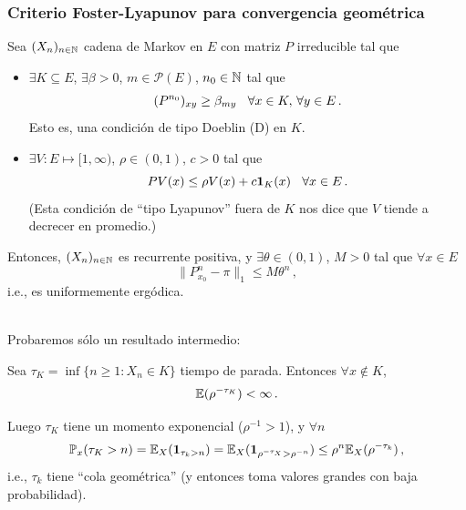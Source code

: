 \subsubsection{Criterio Foster-Lyapunov para convergencia geométrica}
\begin{theorem}[de Harris]
Sea $(X_n)_{n\in\mathbb{N}}$ cadena de Markov en $E$ con matriz $P$ irreducible tal que
\begin{itemize}
    \item $\exists K\subseteq E$, $\exists\beta>0$, $m\in\mathcal{P}(E)$, $n_0\in\mathbb{N}$ tal que
    $$ (P^{n_0})_{xy}\geq\beta_{my}\hspace{.25cm}\,\forall x\in K,\,\forall y\in E \, .$$
    Esto es, una condición de tipo Doeblin (D) en $K$.
    \item $\exists V:E\longmapsto [1,\infty)$, $\rho\in(0,1)$, $c>0$ tal que
    $$ PV(x)\leq\rho V(x)+c\mathbf{1}_K(x) \hspace{.25cm}\,\forall x\in E \,.$$
    (Esta condición de ``tipo Lyapunov'' fuera de $K$ nos dice que $V$ tiende a decrecer en promedio.)
\end{itemize}
Entonces, $(X_n)_{n\in\mathbb{N}}$ es recurrente positiva, y $\exists\theta\in(0,1)$, $M>0$ tal que $\forall x\in E$
$$ \|P^n_{x_0}-\pi\|_1\leq M\theta^n \, ,$$
i.e., es uniformemente ergódica.
\end{theorem}
\vspace{.5cm}\\
Probaremos sólo un resultado intermedio:
\begin{lemma}
Sea $\tau_K=\inf\{n\geq1:X_n\in K\}$ tiempo de parada. Entonces $\forall x\notin K$,
$$ \mathbb{E}(\rho^{-\tau_K})<\infty \, .$$
\end{lemma}
\begin{remark}
Luego $\tau_K$ tiene un momento exponencial ($\rho^{-1}>1$), y $\forall n$
$$ \mathbb{P}_x(\tau_K>n)=\mathbb{E}_X(\mathbf{1}_{\tau_k>n})=\mathbb{E}_X(\mathbf{1}_{\rho^{-\tau_X}>\rho^{-n}})\leq\rho^n\mathbb{E}_X(\rho^{-\tau_k}) \, ,$$
i.e., $\tau_k$ tiene ``cola geométrica'' (y entonces toma valores grandes con baja probabilidad).
\end{remark}
